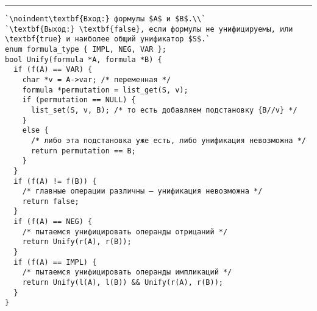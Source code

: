 \documentclass{article}
\begin{document}
\vspace{5pt} \hrule
\begin{lstlisting}[caption={Рекурсивная функция Unify}, label=p152_unify, escapechar=`]
`\noindent\textbf{Вход:} формулы $A$ и $B$.\\`
`\textbf{Выход:} \textbf{false}, если формулы не унифицируемы, или \textbf{true} и наиболее общий унификатор $S$.`
enum formula_type { IMPL, NEG, VAR };
bool Unify(formula *A, formula *B) {
  if (f(A) == VAR) {
    char *v = A->var; /* переменная */
    formula *permutation = list_get(S, v);
    if (permutation == NULL) {
      list_set(S, v, B); /* то есть добавляем подстановку {B//v} */
    }
    else {
      /* либо эта подстановка уже есть, либо унификация невозможна */
      return permutation == B;
    }
  }
  if (f(A) != f(B)) {
    /* главные операции различны — унификация невозможна */
    return false;
  }
  if (f(A) == NEG) {
    /* пытаемся унифицировать операнды отрицаний */
    return Unify(r(A), r(B));
  }
  if (f(A) == IMPL) {
    /* пытаемся унифицировать операнды импликаций */
    return Unify(l(A), l(B)) && Unify(r(A), r(B));
  }
}
\end{lstlisting}
\end{document}

